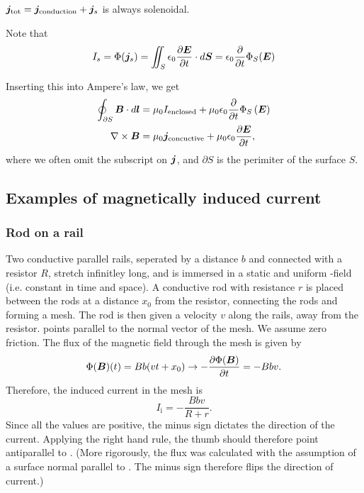     $\bm{j}_{\text{tot}} = \bm{j}_{\text{conduction}} + \bm{j}_s$ is always solenoidal. 

    Note that 
    \begin{equation*}
        I_s = \Phi(\bm{j}_s) = \iint_S \epsilon_0\frac{\partial\bm{E}}{\partial t}\cdot d\bm{S} = \epsilon_0\frac{\partial}{\partial t}\Phi_S(\bm{E})
    \end{equation*}

    Inserting this into Ampere's law, we get 
    \begin{align}
        \oint_{\partial S}\bm{B}\cdot d\bm{l} &= \mu_0 I_{\text{enclosed}} + \mu_0\epsilon_0\frac{\partial}{\partial t}\Phi_S\left(\bm{E}\right)\\
        \nabla\times\bm{B} &= \mu_0\bm{j}_{\text{concuctive}} + \mu_0\epsilon_0\frac{\partial\bm{E}}{\partial t},
    \end{align}
    where we often omit the subscript on $\bm{j}$, and $\partial S$ is the perimiter of the surface $S$.

\subsection{Examples of magnetically induced current}
    \subsubsection{Rod on a rail}
        Two conductive parallel rails, seperated by a distance $b$ and connected with a resistor $R$, stretch infinitley long, 
        and is immersed in a static and uniform \B-field (i.e. constant in time and space). 
        A conductive rod with resistance $r$ is placed between the rods at a distance $x_0$ from the resistor, 
        connecting the rods and forming a mesh. The rod is then given a velocity $v$ along the rails, away from the resistor.
        \B{} points parallel to the normal vector of the mesh. We assume zero friction. 
        The flux of the magnetic field through the mesh is given by
        \begin{equation}
            \Phi(\bm{B})(t) = Bb(vt+x_0) \rightarrow -\frac{\partial \Phi(\bm{B})}{\partial t} = -Bbv.
        \end{equation}
        Therefore, the induced current in the mesh is
        \begin{equation}
            I_\text{i} = -\frac{Bbv}{R+r}.
        \end{equation}
        Since all the values are positive, the minus sign dictates the direction of the current. Applying the right hand rule,
        the thumb should therefore point antiparallel to \B. 
        (More rigorously, the flux was calculated with the assumption of a surface normal parallel to \B. 
        The minus sign therefore flips the direction of current.)

